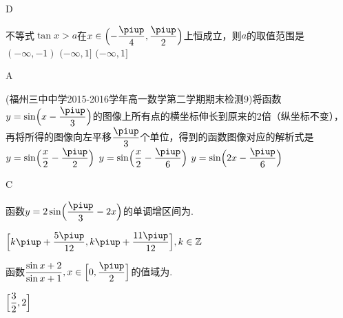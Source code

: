 \begin{exercise}
      \begin{answer}
        D
      \end{answer}
    \item%
      不等式$\tan x>a$在$x\in\Bigl(-\dfrac{\piup}4,\dfrac{\piup}2 \Bigr)$上恒成立，则$a$的取值范围是\xz
      \xx{$(-\infty,-1]$}
        {$(-\infty,-1)$}
        {$(-\infty,1]$}
        {$(-\infty,1]$}
      \begin{answer}
        A
      \end{answer}
    \item%
      (福州三中中学2015-2016学年高一数学第二学期期末检测9)将函数$y=\sin\Bigl(x-\dfrac{\piup}3\Bigr)$的图像上所有点的横坐标伸长到原来的2倍（纵坐标不变），再将所得的图像向左平移$\dfrac{\piup}3$个单位，得到的函数图像对应的解析式是\xz
        {$y=\sin\Bigl(\dfrac x2-\dfrac{\piup}2\Bigr)$}
        {$y=\sin\Bigl(\dfrac{x}2-\dfrac{\piup}6\Bigr)$}
        {$y=\sin\Bigl(2x-\dfrac{\piup}6\Bigr)$}
      \begin{answer}
        C
      \end{answer}
    \item%
      函数$y=2\sin\Bigl(\dfrac{\piup}3-2x \Bigr)$的单调增区间为\tk.
      \begin{answer}
        $\Bigl[k\piup+\dfrac{5\piup}{12},k\piup+\dfrac{11\piup}{12} \Bigr],k\in\mathbb{Z}$
      \end{answer}
    \item%
      函数$\dfrac{\sin x+2}{\sin x+1},x\in\Bigl[0,\dfrac{\piup}2\Bigr]$的值域为\tk.
      \begin{answer}
        $\Bigl[\dfrac32,2\Bigr]$
      \end{answer}


\end{exercise}
